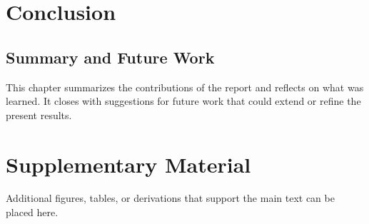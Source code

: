 \documentclass[11pt,a4paper]{report}
\begin{document}
\chapter{Conclusion}
\section{Summary and Future Work}
This chapter summarizes the contributions of the report and reflects on what was learned. It closes with suggestions for future work that could extend or refine the present results.

\printbibliography[heading=bibintoc, title={References}]

\appendix
\chapter{Supplementary Material}
Additional figures, tables, or derivations that support the main text can be placed here.
\end{document}
